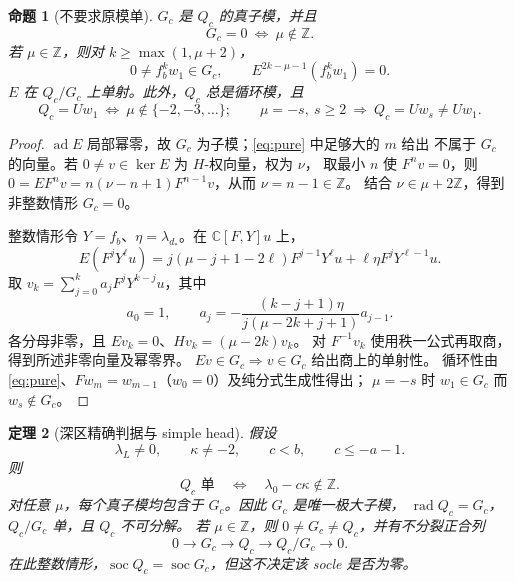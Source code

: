 \documentclass[UTF8,11pt,a4paper,fontset=fandol]{ctexart}
\theoremstyle{upright}
\newtheorem{theorem}{定理}[section]
\newtheorem{proposition}[theorem]{命题}
\newcommand{\C}{\mathbb C}
\newcommand{\Z}{\mathbb Z}
\DeclareMathOperator{\ad}{ad}
\DeclareMathOperator{\soc}{soc}
\DeclareMathOperator{\rad}{rad}
\begin{document}
\begin{proposition}[不要求原模单]\label{prop:G}
$G_c$ 是 $Q_c$ 的真子模，并且
\[
G_c=0\ \Longleftrightarrow\ \mu\notin\Z.
\]
若 $\mu\in\Z$，则对 $k\ge\max(1,\mu+2)$，
\[
0\ne f_b^kw_1\in G_c,\qquad E^{2k-\mu-1}(f_b^kw_1)=0.
\]
$E$ 在 $Q_c/G_c$ 上单射。此外，$Q_c$ 总是循环模，且
\[
Q_c=Uw_1\ \Longleftrightarrow\ \mu\notin\{-2,-3,\ldots\};
\qquad \mu=-s,\ s\ge2\ \Longrightarrow\ Q_c=Uw_s\ne Uw_1.
\]
\end{proposition}
\begin{proof}
$\ad E$ 局部幂零，故 $G_c$ 为子模；\eqref{eq:pure} 中足够大的 $m$ 给出
不属于 $G_c$ 的向量。若 $0\ne v\in\ker E$ 为 $H$-权向量，权为 $\nu$，
取最小 $n$ 使 $F^nv=0$，则
$0=EF^nv=n(\nu-n+1)F^{n-1}v$，从而 $\nu=n-1\in\Z$。
结合 $\nu\in\mu+2\Z$，得到非整数情形 $G_c=0$。

整数情形令 $Y=f_b$、$\eta=\lambda_{d_*}$。在 $\C[F,Y]u$ 上，
\[
E(F^jY^\ell u)=j(\mu-j+1-2\ell)F^{j-1}Y^\ell u
+\ell\eta F^jY^{\ell-1}u.
\]
取 $v_k=\sum_{j=0}^k a_jF^jY^{k-j}u$，其中
\[
a_0=1,\qquad a_j=-\frac{(k-j+1)\eta}{j(\mu-2k+j+1)}a_{j-1}.
\]
各分母非零，且 $Ev_k=0$、$Hv_k=(\mu-2k)v_k$。
对 $F^{-1}v_k$ 使用秩一公式再取商，得到所述非零向量及幂零界。
$Ev\in G_c\Rightarrow v\in G_c$ 给出商上的单射性。
循环性由 \eqref{eq:pure}、$Fw_m=w_{m-1}$（$w_0=0$）及纯分式生成性得出；
$\mu=-s$ 时 $w_1\in G_c$ 而 $w_s\notin G_c$。
\end{proof}

\begin{theorem}[深区精确判据与 simple head]\label{thm:main}
假设
\begin{equation}\label{eq:main-assumptions}
\lambda_L\ne0,\qquad \kappa\ne-2,\qquad c<b,\qquad c\le-a-1.
\end{equation}
则
\[
\boxed{\quad Q_c\text{ 单}\quad\Longleftrightarrow\quad
\lambda_0-c\kappa\notin\Z.\quad}
\]
对任意 $\mu$，每个真子模均包含于 $G_c$。因此 $G_c$ 是唯一极大子模，
$\rad Q_c=G_c$，$Q_c/G_c$ 单，且 $Q_c$ 不可分解。
若 $\mu\in\Z$，则 $0\ne G_c\ne Q_c$，并有不分裂正合列
\begin{equation}\label{eq:head}
0\longrightarrow G_c\longrightarrow Q_c\longrightarrow Q_c/G_c\longrightarrow0.
\end{equation}
在此整数情形，$\soc Q_c=\soc G_c$，但这不决定该 socle 是否为零。
\end{theorem}
\end{document}
